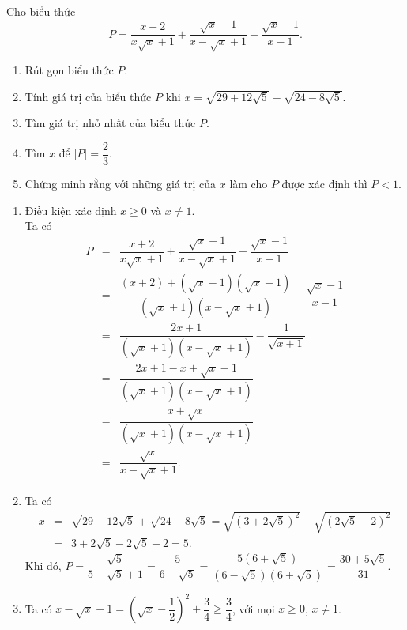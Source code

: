 \begin{bt}%
	Cho biểu thức
	$$P=\dfrac{x+2}{x\sqrt{x}+1} + \dfrac{\sqrt{x}-1}{x-\sqrt{x}+1} - \dfrac{\sqrt{x}-1}{x-1}.$$
	\begin{enumerate}
		\item Rút gọn biểu thức $P$.
		\item Tính giá trị của biểu thức $P$ khi $x=\sqrt{29+12\sqrt{5}} - \sqrt{24-8\sqrt{5}}$.
		\item Tìm giá trị nhỏ nhất của biểu thức $P$.
		\item Tìm $x$ để $|P|=\dfrac{2}{3}$.
		\item Chứng minh rằng với những giá trị của $x$ làm cho $P$ được xác định thì $P<1$.
	\end{enumerate}
	\loigiai
	{
		\begin{enumerate}
			\item Điều kiện xác định $x \geq 0$ và $x \neq 1$.\\
			Ta có
			\allowdisplaybreaks
			\begin{eqnarray*}
				P &=& \dfrac{x+2}{x\sqrt{x}+1} + \dfrac{\sqrt{x}-1}{x-\sqrt{x}+1} - \dfrac{\sqrt{x}-1}{x-1}\\
				&=& \dfrac{(x+2)+\left(\sqrt{x}-1\right)\left(\sqrt{x}+1\right)}{\left(\sqrt{x}+1\right)\left(x-\sqrt{x}+1\right)} - \dfrac{\sqrt{x}-1}{x-1}\\
				&=& \dfrac{2x+1}{\left(\sqrt{x}+1\right)\left(x-\sqrt{x}+1\right)} - \dfrac{1}{\sqrt{x+1}}\\
				&=& \dfrac{2x+1-x+\sqrt{x}-1}{\left(\sqrt{x}+1\right)\left(x-\sqrt{x}+1\right)}\\
				&=& \dfrac{x+\sqrt{x}}{\left(\sqrt{x}+1\right)\left(x-\sqrt{x}+1\right)}\\
				&=& \dfrac{\sqrt{x}}{x-\sqrt{x}+1}.
			\end{eqnarray*}
			\item Ta có
			\allowdisplaybreaks
			\begin{eqnarray*}
				x &=& \sqrt{29+12\sqrt{5}} + \sqrt{24-8\sqrt{5}} = \sqrt{\left(3+2\sqrt{5}\right)^2}-\sqrt{\left(2\sqrt{5}-2\right)^2}\\
				&=& 3+2\sqrt{5} - 2\sqrt{5}+2 = 5.
			\end{eqnarray*}
			Khi đó, $P = \dfrac{\sqrt{5}}{5-\sqrt{5}+1} = \dfrac{5}{6-\sqrt{5}} = \dfrac{5\left(6+\sqrt{5}\right)}{\left(6-\sqrt{5}\right)\left(6+\sqrt{5}\right)} = \dfrac{30+5\sqrt{5}}{31}$.
			\item Ta có $x-\sqrt{x}+1 = \left(\sqrt{x}-\dfrac{1}{2}\right)^2+\dfrac{3}{4} \geq \dfrac{3}{4}$, với mọi $x\geq 0$, $x \neq 1$.\\

\end{enumerate}}
\end{bt}
